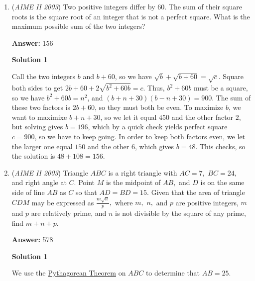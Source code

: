 \begin{enumerate}
 By \href{https://artofproblemsolving.com/wiki/index.php?title=Newton\%27s\_Sums}{Newton's Sums} the sum of the squares of the roots is 3, and by \href{https://artofproblemsolving.com/wiki/index.php?title=Vieta\%27s\_Formulas}{Vieta's Formulas} the sum of the roots is 1. So our answer is $3 - 1  + 4 = \boxed{006}$. 

 
[rule]

 Nice!-sleepypuppy

 


	\item (\textit{AIME II 2003}) Two positive integers differ by $60.$ The sum of their square roots is the square root of an integer that is not a perfect square. What is the maximum possible sum of the two integers?


 
 \textbf{Answer: }156



\textbf{Solution 1}

Call the two integers $b$ and $b+60$, so we have $\sqrt{b}+\sqrt{b+60}=\sqrt{c}$. Square both sides to get $2b+60+2\sqrt{b^2+60b}=c$. Thus, $b^2+60b$ must be a square, so we have $b^2+60b=n^2$, and $(b+n+30)(b-n+30)=900$. The sum of these two factors is $2b+60$, so they must both be even. To maximize $b$, we want to maximixe $b+n+30$, so we let it equal $450$ and the other factor $2$, but solving gives $b=196$, which by a quick check yields perfect square $c=900$, so we have to keep going. In order to keep both factors even, we let the larger one equal $150$ and the other $6$, which gives $b=48$. This checks, so the solution is $48+108=\boxed{156}$.

 


	\item (\textit{AIME II 2003}) Triangle $ABC$ is a right triangle with $AC = 7,$ $BC = 24,$ and right angle at $C.$ Point $M$ is the midpoint of $AB,$ and $D$ is on the same side of line $AB$ as $C$ so that $AD = BD = 15.$ Given that the area of triangle $CDM$ may be expressed as $\frac {m\sqrt {n}}{p},$ where $m,$ $n,$ and $p$ are positive integers, $m$ and $p$ are relatively prime, and $n$ is not divisible by the square of any prime, find $m + n + p.$

 \textbf{Answer: }578



\textbf{Solution 1}

We use the \href{https://artofproblemsolving.com/wiki/index.php?title=Pythagorean\_Theorem}{Pythagorean Theorem} on $ABC$ to determine that $AB=25.$


\end{enumerate}
